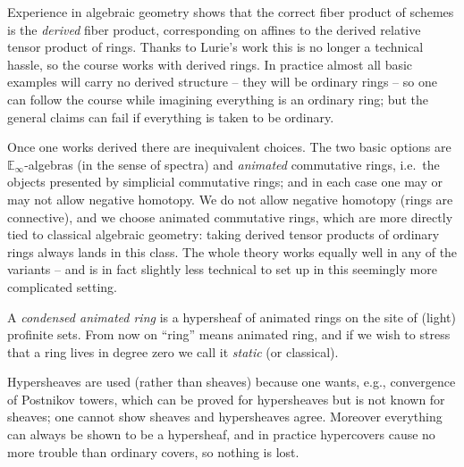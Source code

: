 \begin{remark}
\label{rmk:1:which-ring}
Experience in algebraic geometry shows that the correct fiber product of schemes
is the \emph{derived} fiber product, corresponding on affines to the derived
relative tensor product of rings. Thanks to Lurie's work \cite{lurie2017higher}
this is no longer a technical hassle, so the course works with derived rings. In
practice almost all basic examples will carry no derived structure -- they will
be ordinary rings -- so one can follow the course while imagining everything is
an ordinary ring; but the general claims can fail if everything is taken to be
ordinary.

Once one works derived there are inequivalent choices. The two basic options are
$\mathbb{E}_\infty$-algebras (in the sense of spectra) and \emph{animated}
commutative rings, i.e.\ the objects presented by simplicial commutative rings;
and in each case one may or may not allow negative homotopy. We do not allow
negative homotopy (rings are connective), and we choose animated commutative
rings, which are more directly tied to classical algebraic geometry: taking
derived tensor products of ordinary rings always lands in this class. The whole
theory works equally well in any of the variants -- and is in fact slightly less
technical to set up in this seemingly more complicated setting.
\end{remark}

\begin{definition}
\label{def:1:condensed-animated-ring}
A \emph{condensed animated ring} is a hypersheaf of animated rings on the site of
(light) profinite sets. From now on ``ring'' means animated ring, and if we wish
to stress that a ring lives in degree zero we call it \emph{static} (or
classical).
\end{definition}

\begin{remark}
\label{rmk:1:hypersheaves}
Hypersheaves are used (rather than sheaves) because one wants, e.g., convergence
of Postnikov towers, which can be proved for hypersheaves but is not known for
sheaves; one cannot show sheaves and hypersheaves agree. Moreover everything can
always be shown to be a hypersheaf, and in practice hypercovers cause no more
trouble than ordinary covers, so nothing is lost.
\end{remark}

